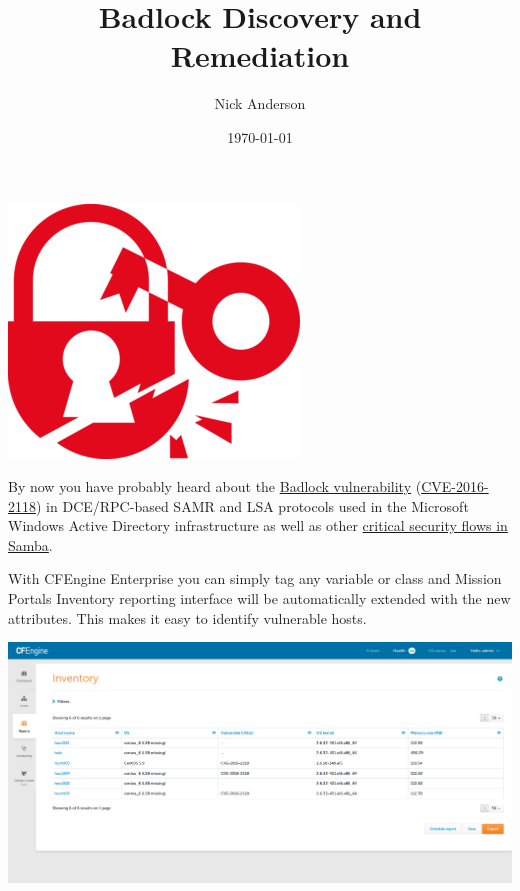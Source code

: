 \documentclass[11pt]{article}
\author{Nick Anderson}
\date{\today}
\title{Badlock Discovery and Remediation}
\begin{document}
\maketitle
\tableofcontents

\includegraphics[width=.9\linewidth]{../media/badlock.png}


By now you have probably heard about the \href{https://access.redhat.com/security/vulnerabilities/badlock}{Badlock vulnerability} (\href{https://cve.mitre.org/cgi-bin/cvename.cgi?name=CVE-2016-2118}{CVE-2016-2118})
in DCE/RPC-based SAMR and LSA protocols used in the Microsoft Windows Active
Directory infrastructure as well as other \href{https://access.redhat.com/articles/2243351}{critical security flows in Samba}.

With CFEngine Enterprise you can simply tag any variable or class and Mission
Portals Inventory reporting interface will be automatically extended with the
new attributes. This makes it easy to identify vulnerable hosts.

\includegraphics[width=.9\linewidth]{../media/inventory_report_vulnerable_cves.png}
\end{document}
